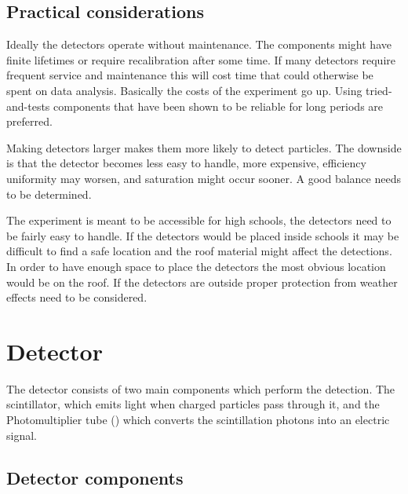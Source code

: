 \subsection{Practical considerations}

Ideally the detectors operate without maintenance. The components might have finite lifetimes or require recalibration after some time. If many detectors require frequent service and maintenance this will cost time that could otherwise be spent on data analysis. Basically the costs of the experiment go up. Using tried-and-tests components that have been shown to be reliable for long periods are preferred.

Making detectors larger makes them more likely to detect particles. The downside is that the detector becomes less easy to handle, more expensive, efficiency uniformity may worsen, and saturation might occur sooner. A good balance needs to be determined.

The experiment is meant to be accessible for high schools, the detectors need to be fairly easy to handle. If the detectors would be placed inside schools it may be difficult to find a safe location and the roof material might affect the detections. In order to have enough space to place the detectors the most obvious location would be on the roof. If the detectors are outside proper protection from weather effects need to be considered.


\section{Detector}

The detector consists of two main components which perform the detection. The scintillator, which emits light when charged particles pass through it, and the Photomultiplier tube (\pmt) which converts the scintillation photons into an electric signal.

\subsection{Detector components}

